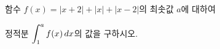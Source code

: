 함수 $f(x)=|x+2|+|x|+|x-2|$의 최솟값 $a$에 대하여\par\noindent 정적분 $\displaystyle\int_{1}^{a}f(x)\mkern3mu dx$의 값을 구하시오.
